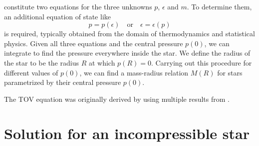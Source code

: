 constitute two equations for the three unknowns $p$, $\epsilon$ and $m$.
To determine them, an additional equation of state like
\begin{equation}
	p = p(\epsilon)
	\quad \text{or} \quad
	\epsilon = \epsilon(p)
\end{equation}
is required, typically obtained from the domain of thermodynamics and statistical physics.
Given all three equations and the central pressure $p(0)$, we can integrate to find the pressure everywhere inside the star.
We define the radius of the star to be the radius $R$ at which $p(R) = 0$.
Carrying out this procedure for different values of $p(0)$, we can find a mass-radius relation $M(R)$ for stars parametrized by their central pressure $p(0)$.

The TOV equation was originally derived by \cite{ref:tov} using multiple results from \cite{ref:tolman}.

\section{Solution for an incompressible star}
\label{sec:incompressible_star}


